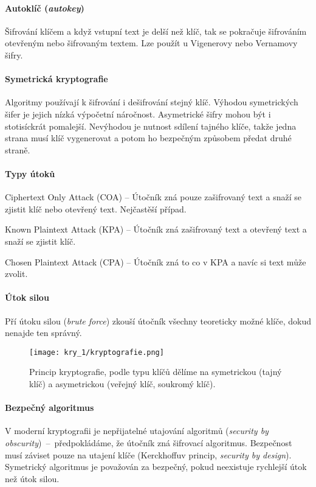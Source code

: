 \paragraph*{Autoklíč (\textit{autokey})} Šifrování klíčem a když vstupní text je delší než klíč, tak se pokračuje šifrováním otevřeným nebo šifrovaným textem. Lze použít u Vigenerovy nebo Vernamovy šifry.

\paragraph*{Symetrická kryptografie} Algoritmy používají k šifrování i dešifrování stejný klíč. Výhodou symetrických šifer je jejich nízká výpočetní náročnost. Asymetrické šifry mohou být i stotisíckrát pomalejší. Nevýhodou je nutnost sdílení tajného klíče, takže jedna strana musí klíč vygenerovat a potom ho bezpečným způsobem předat druhé straně.

\paragraph*{Typy útoků} \begin{compactitem}
    \item Ciphertext Only Attack (COA) -- Útočník zná pouze zašifrovaný text a snaží se zjistit klíč nebo otevřený text. Nejčastěší případ.
    \item Known Plaintext Attack (KPA) -- Útočník zná zašifrovaný text a otevřený text a snaží se zjistit klíč.
    \item Chosen Plaintext Attack (CPA) -- Útočník zná to co v KPA a navíc si text může zvolit.
\end{compactitem}

\paragraph*{Útok silou} Pří útoku silou (\textit{brute force}) zkouší útočník všechny teoreticky možné klíče, dokud nenajde ten správný.

\begin{figure}[H]
    \centering
    \texttt{[image: kry\_1/kryptografie.png]}
    \caption{Princip kryptografie, podle typu klíčů dělíme na symetrickou (tajný klíč) a asymetrickou (veřejný klíč, soukromý klíč).}
\end{figure}

\paragraph*{Bezpečný algoritmus} V moderní kryptografii je nepřijatelné utajování algoritmů (\textit{security by obscurity})~--~předpokládáme, že útočník zná šifrovací algoritmus. Bezpečnost musí záviset pouze na utajení klíče (Kerckhoffuv princip, \textit{security by design}). Symetrický algoritmus je považován za bezpečný, pokud neexistuje rychlejší útok než útok silou.

